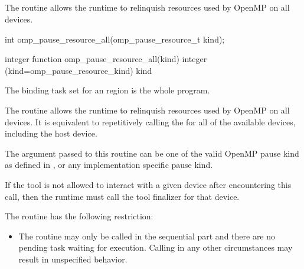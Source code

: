 \subsection{}
\label{subsec:omp_pause_resource_all}
\summary

The  routine allows the runtime to 
relinquish resources used by OpenMP on all devices.

\begin{samepage}
\format
\begin{ccppspecific}
\begin{ompcFunction}
int omp_pause_resource_all(omp_pause_resource_t kind);
\end{ompcFunction}
\end{ccppspecific}
\end{samepage}

\begin{fortranspecific}
\begin{ompfFunction}
integer function omp_pause_resource_all(kind)
integer (kind=omp_pause_resource_kind) kind
\end{ompfFunction}
\end{fortranspecific}

\binding

The binding task set for an  region is the whole program.

\effect

The  routine allows the runtime to relinquish resources 
used by OpenMP on all devices. It is equivalent to repetitively 
calling the  for all of the available devices, including the host device.

The argument  passed to this routine can be one of the valid OpenMP pause kind 
as defined in , or any implementation specific pause kind.

\tools

If the tool is not allowed to interact with a given device after encountering this call, then the runtime must call
the tool finalizer for that device.

\restrictions
The   routine has the following restriction:

\begin{itemize}
\item The routine may only be called in the sequential part and there are no pending task waiting for execution. Calling in any other circumstances may result in unspecified behavior.
\end{itemize}


